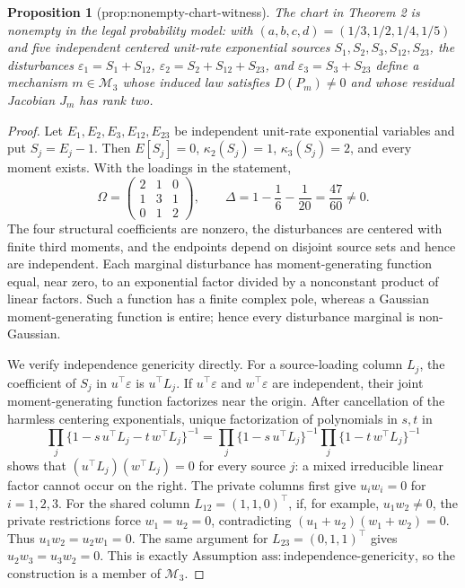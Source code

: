 \documentclass{article}
\newtheorem{proposition}{Proposition}
\begin{document}
\begin{proposition}[prop:nonempty-chart-witness]\label{prop:nonempty-chart-witness}
The chart in Theorem 2 is nonempty in the legal probability model: with \((a,b,c,d)=(1/3,1/2,1/4,1/5)\) and five independent centered unit-rate exponential sources \(S_1,S_2,S_3,S_{12},S_{23}\), the disturbances \(\varepsilon_1=S_1+S_{12}\), \(\varepsilon_2=S_2+S_{12}+S_{23}\), and \(\varepsilon_3=S_3+S_{23}\) define a mechanism \(m\in\mathcal M_3\) whose induced law satisfies \(D(P_m)\neq0\) and whose residual Jacobian \(J_m\) has rank two.
\end{proposition}
\begin{proof}
Let \(E_1,E_2,E_3,E_{12},E_{23}\) be independent unit-rate exponential variables and put \(S_j=E_j-1\). Then \(E[S_j]=0\), \(\kappa_2(S_j)=1\), \(\kappa_3(S_j)=2\), and every moment exists. With the loadings in the statement,
\[
\Omega=
\begin{pmatrix}2&1&0\\1&3&1\\0&1&2\end{pmatrix},
\qquad
\Delta=1-\frac16-\frac1{20}=\frac{47}{60}\neq0.
\]
The four structural coefficients are nonzero, the disturbances are centered with finite third moments, and the endpoints depend on disjoint source sets and hence are independent. Each marginal disturbance has moment-generating function equal, near zero, to an exponential factor divided by a nonconstant product of linear factors. Such a function has a finite complex pole, whereas a Gaussian moment-generating function is entire; hence every disturbance marginal is non-Gaussian.

We verify independence genericity directly. For a source-loading column \(L_j\), the coefficient of \(S_j\) in \(u^\top\varepsilon\) is \(u^\top L_j\). If \(u^\top\varepsilon\) and \(w^\top\varepsilon\) are independent, their joint moment-generating function factorizes near the origin. After cancellation of the harmless centering exponentials, unique factorization of polynomials in \(s,t\) in
\[
\prod_j\{1-s\,u^\top L_j-t\,w^\top L_j\}^{-1}
=\prod_j\{1-s\,u^\top L_j\}^{-1}
 \prod_j\{1-t\,w^\top L_j\}^{-1}
\]
shows that \((u^\top L_j)(w^\top L_j)=0\) for every source \(j\): a mixed irreducible linear factor cannot occur on the right. The private columns first give \(u_iw_i=0\) for \(i=1,2,3\). For the shared column \(L_{12}=(1,1,0)^\top\), if, for example, \(u_1w_2\neq0\), the private restrictions force \(w_1=u_2=0\), contradicting \((u_1+u_2)(w_1+w_2)=0\). Thus \(u_1w_2=u_2w_1=0\). The same argument for \(L_{23}=(0,1,1)^\top\) gives \(u_2w_3=u_3w_2=0\). This is exactly Assumption \(\mathrm{ass:independence\mbox{-}genericity}\), so the construction is a member of \(\mathcal M_3\).


\end{proof}
\end{document}

